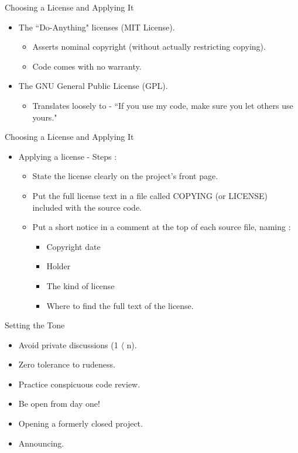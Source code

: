 \documentclass{beamer}
\begin{document}
\begin{frame}{Choosing a License and Applying It} 
\begin{itemize}
	\item The ``Do-Anything" licenses (MIT License). 
	\begin{itemize}
		\item Asserts nominal copyright (without actually restricting copying). 
		\item Code comes with no warranty. 
	\end{itemize}
	\item The GNU General Public License (GPL). 
	\begin{itemize}
		\item Translates loosely to - ``If you use my code, make sure you let others use yours."
	\end{itemize}
\end{itemize}
\end{frame}

\begin{frame}{Choosing a License and Applying It} 
\begin{itemize}
	\item Applying a license - Steps : 
	\begin{itemize}
		\item State the license clearly on the project's front page. 
		\item Put the full license text in a file called COPYING (or LICENSE) included with the source code. 
		\item Put a short notice in a comment at the top of each source file, naming :
		\begin{itemize}
			\item Copyright date
			\item Holder
			\item The kind of license
			\item Where to find the full text of the license. 
		\end{itemize}
	\end{itemize}
\end{itemize}
\end{frame}

\begin{frame}{Setting the Tone}
\begin{itemize}
	\item Avoid private discussions (1 $\langle$ n).
	\item Zero tolerance to rudeness. 
	\item Practice conspicuous code review. 
	\item Be open from day one! 
	\item Opening a formerly closed project. 
	\item Announcing. 
\end{itemize}
\end{frame}
\end{document}
